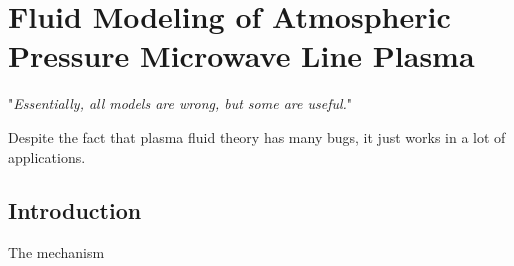 \clearpage{\pagestyle{empty}\cleardoublepage}		%
\chapter{Fluid Modeling of Atmospheric Pressure Microwave Line Plasma}
\label{chap:theory}

\begin{flushright}
"\textit{Essentially, all models are wrong, but some are useful.}"~\cite{box1976science}
\end{flushright}
\vspace{0.35cm}
Despite the fact that plasma fluid theory has many bugs, it just works in a lot of applications.
\vspace{1cm}
%
\section{Introduction}
The mechanism

